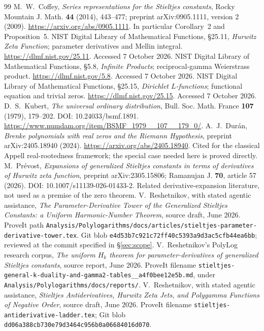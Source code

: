 \documentclass[11pt]{article}
\theoremstyle{definition}
\theoremstyle{remark}
\begin{document}
\begin{thebibliography}{99}
 M.~W.~Coffey, \emph{Series representations for the Stieltjes constants}, Rocky Mountain J. Math. \textbf{44} (2014), 443--477; preprint arXiv:0905.1111, version 2 (2009). \url{https://arxiv.org/abs/0905.1111}. In particular Corollary~2 and Proposition~5.
 NIST Digital Library of Mathematical Functions, \S25.11, \emph{Hurwitz Zeta Function}; parameter derivatives and Mellin integral. \url{https://dlmf.nist.gov/25.11}. Accessed 7 October 2026.
 NIST Digital Library of Mathematical Functions, \S5.8, \emph{Infinite Products}; reciprocal-gamma Weierstrass product. \url{https://dlmf.nist.gov/5.8}. Accessed 7 October 2026.
 NIST Digital Library of Mathematical Functions, \S25.15, \emph{Dirichlet $L$-functions}; functional equation and trivial zeros. \url{https://dlmf.nist.gov/25.15}. Accessed 7 October 2026.
 D.~S.~Kubert, \emph{The universal ordinary distribution}, Bull. Soc. Math. France \textbf{107} (1979), 179--202. DOI: 10.24033/bsmf.1891. \url{https://www.numdam.org/item/BSMF_1979__107__179_0/}.
 A.~J.~Dur\'an, \emph{Brenke polynomials with real zeros and the Riemann Hypothesis}, preprint arXiv:2405.18940 (2024). \url{https://arxiv.org/abs/2405.18940}. Cited for the classical Appell real-rootedness framework; the special case needed here is proved directly.
 M.~Pr\'evost, \emph{Expansions of generalized Stieltjes constants in terms of derivatives of Hurwitz zeta function}, preprint arXiv:2305.15806; Ramanujan J. \textbf{70}, article 57 (2026). DOI: 10.1007/s11139-026-01433-2. Related derivative-expansion literature, not used as a premise of the zero theorem.
 V.~Reshetnikov, with stated agentic assistance, \emph{The Parameter-Derivative Tower of the Generalized Stieltjes Constants: a Uniform Harmonic-Number Theorem}, source draft, June 2026. ProveIt path \nolinkurl{Analysis/Polylogarithms/docs/articles/stieltjes-parameter-derivative-tower.tex}. Git blob \texttt{e4d53b7c921c72ff40c5393a9d3ac5cfb44ea6bb}; reviewed at the commit specified in \S\ref{sec:scope}.
 V.~Reshetnikov's PolyLog research corpus, \emph{The uniform $H_k$ theorem for parameter-derivatives of generalized Stieltjes constants}, source report, June 2026. ProveIt filename \texttt{stieltjes-general-k-duality-and-gamma2-tables\_\_a4f0bee12e5b.md}, under \texttt{Analysis/Polylogarithms/docs/reports/}.
 V.~Reshetnikov, with stated agentic assistance, \emph{Stieltjes Antiderivatives, Hurwitz Zeta Jets, and Polygamma Functions of Negative Order}, source draft, June 2026. ProveIt filename \texttt{stieltjes-antiderivative-ladder.tex}; Git blob \texttt{dd06a388cb730e79d3464c956b0a06684016d070}.

\end{thebibliography}
\end{document}
